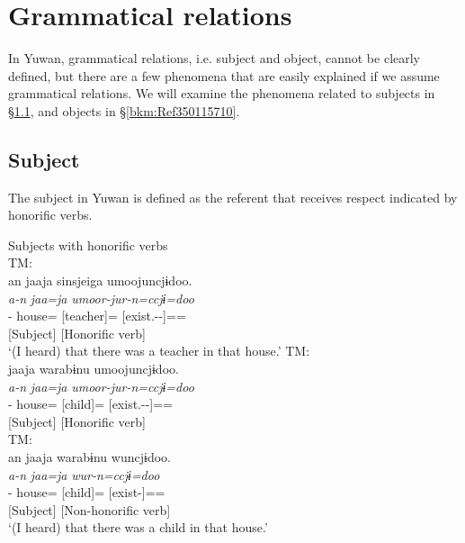 \chapter{Grammatical relations}\label{chap:3}\hypertarget{RefHeadingToc395696987}{}
In Yuwan, grammatical relations, i.e. subject and object, cannot be clearly defined, but there are a few phenomena that are easily explained if we assume grammatical relations. We will examine the phenomena related to subjects in §\ref{bkm:Ref350115473}, and objects in §\ref{bkm:Ref350115710}.

\section{Subject}
\label{bkm:Ref350115473}\hypertarget{RefHeadingToc395696988}{}
The subject in Yuwan is defined as the referent that receives respect indicated by honorific verbs.

{\smallex
\ea  Subjects with honorific verbs\\
\ea\label{ex:3.1a} TM:\hfill\relax[El: 120924] \\ \gllll  an  {jaaja}  {sinsjeiga}  {umoojuncjɨdoo.}\\
                {\itshape a-n}  {\itshape jaa=ja}    {\itshape umoor-jur-n=ccjɨ=doo}\\
                {\DIST-\ADNZ}  {house=\TOP}  {[teacher]=\NOM}  {[exist.\HON-\UMRK-\PTCP]=\QT=\ASS}\\
                     {[Subject]} {} {} {[Honorific verb]}\\
\glt ‘(I heard) that there was a teacher in that house.’ 
\ex\label{ex:3.1b} TM: \hfill\relax [El: 120924]\\   {jaaja}  {warabɨnu}  {umoojuncjɨdoo.}\\
               {\itshape a-n}  {\itshape jaa=ja}    {\itshape umoor-jur-n=ccjɨ=doo}\\
                {\DIST-\ADNZ}  {house=\TOP}  {[child]=\NOM}  {[exist.\HON-\UMRK-\PTCP]=\QT=\ASS}\\
                {[Subject]} {}  {}  {[Honorific verb]}\\

\ex\label{ex:3.1c} TM:\hfill\relax[El: 120924]\\ \gllll  an  {jaaja}  {warabɨnu}  {wuncjɨdoo.}\\
            {\itshape a-n}  {\itshape jaa=ja}    {\itshape wur-n=ccjɨ=doo}\\
            {\DIST-\ADNZ}  {house=\TOP}  {[child]=\NOM}  {[exist-\PTCP]=\QT=\ASS}\\
             {[Subject]} {}   {}  {[Non-honorific verb]}\\
   \glt  ‘(I heard) that there was a child in that house.’ 
\z
\z}

